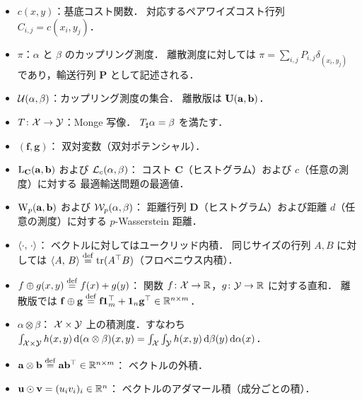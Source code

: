 \begin{itemize}
  \item $c(x, y)$：基底コスト関数．
    対応するペアワイズコスト行列 $C_{i,j} = c(x_i, y_j)$．

  \item $\pi$：$\alpha$ と $\beta$ のカップリング測度．
    離散測度に対しては $\pi = \sum_{i,j} P_{i,j} \delta_{(x_i, y_j)}$
    であり，輸送行列 $\mathbf{P}$ として記述される．

  \item $\mathcal{U}(\alpha, \beta)$：カップリング測度の集合．
    離散版は $\mathbf{U}(\mathbf{a}, \mathbf{b})$．

  \item $T \colon \mathcal{X} \to \mathcal{Y}$：Monge 写像．
    $T_\sharp \alpha = \beta$ を満たす．

  \item $(\mathbf{f}, \mathbf{g})$：
    双対変数（双対ポテンシャル）．

  \item $\mathrm{L}_{\mathbf{C}}(\mathbf{a}, \mathbf{b})$
    および $\mathcal{L}_c(\alpha, \beta)$：
    コスト $\mathbf{C}$（ヒストグラム）および $c$（任意の測度）に対する
    最適輸送問題の最適値．

  \item $\mathrm{W}_p(\mathbf{a}, \mathbf{b})$
    および $\mathcal{W}_p(\alpha, \beta)$：
    距離行列 $\mathbf{D}$（ヒストグラム）および距離 $d$（任意の測度）に対する
    $p$-Wasserstein 距離．

  \item $\langle \cdot,\, \cdot \rangle$：
    ベクトルに対してはユークリッド内積．
    同じサイズの行列 $A, B$ に対しては
    $\langle A,\, B \rangle \overset{\mathrm{def}}{=} \operatorname{tr}(A^\top B)$（フロベニウス内積）．

  \item $f \oplus g(x, y) \overset{\mathrm{def}}{=} f(x) + g(y)$：
    関数 $f \colon \mathcal{X} \to \mathbb{R}$，$g \colon \mathcal{Y} \to \mathbb{R}$ に対する直和．
    離散版では $\mathbf{f} \oplus \mathbf{g}
    \overset{\mathrm{def}}{=} \mathbf{f} \mathbf{1}_m^\top + \mathbf{1}_n \mathbf{g}^\top \in \mathbb{R}^{n \times m}$．

  \item $\alpha \otimes \beta$：
    $\mathcal{X} \times \mathcal{Y}$ 上の積測度．すなわち
    $\int_{\mathcal{X} \times \mathcal{Y}} h(x,y) \, \mathrm{d}(\alpha \otimes \beta)(x,y)
    = \int_{\mathcal{X}} \int_{\mathcal{Y}} h(x,y) \, \mathrm{d}\beta(y) \, \mathrm{d}\alpha(x)$．

  \item $\mathbf{a} \otimes \mathbf{b}
    \overset{\mathrm{def}}{=} \mathbf{a} \mathbf{b}^\top \in \mathbb{R}^{n \times m}$：
    ベクトルの外積．

  \item $\mathbf{u} \odot \mathbf{v}
    = (u_i v_i)_{i} \in \mathbb{R}^n$：
    ベクトルのアダマール積（成分ごとの積）．
\end{itemize}


